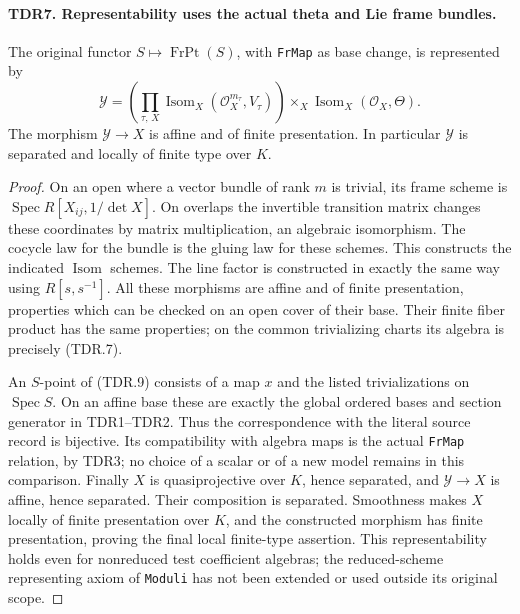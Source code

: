 \paragraph{TDR7. Representability uses the actual theta and Lie frame bundles.}
\label{claim:TDR7}
The original functor \(S\mapsto\operatorname{FrPt}(S)\), with
\texttt{FrMap} as base change, is represented by
\[
 \mathcal Y=
 \left(\prod_{\tau,\,X}
   \operatorname{Isom}_X(\mathcal O_X^{m_\tau},V_\tau)\right)
       \times_X\operatorname{Isom}_X(\mathcal O_X,\Theta).
                                                               \tag{TDR.9}
\]
The morphism \(\mathcal Y\to X\) is affine and of finite
presentation.  In particular \(\mathcal Y\) is separated and
locally of finite type over \(K\).

\begin{proof}
On an open where a vector bundle of rank \(m\) is trivial,
its frame scheme is \(\operatorname{Spec}R[X_{ij},1/\det X]\).
On overlaps the invertible transition matrix changes these
coordinates by matrix multiplication, an algebraic isomorphism.
The cocycle law for the bundle is the gluing law for these schemes.
This constructs the indicated \(\operatorname{Isom}\) schemes.
The line factor is constructed in exactly the same way using
\(R[s,s^{-1}]\).  All these morphisms are affine and of finite
presentation, properties which can be checked on an open cover
of their base.  Their finite fiber product has the same properties;
on the common trivializing charts its algebra is precisely (TDR.7).

An \(S\)-point of (TDR.9) consists of a map \(x\) and the
listed trivializations on \(\operatorname{Spec}S\).  On an
affine base these are exactly the global ordered bases and
section generator in TDR1--TDR2.  Thus the correspondence with
the literal source record is bijective.  Its compatibility with
algebra maps is the actual \texttt{FrMap} relation, by TDR3;
no choice of a scalar or of a new model remains in this comparison.
Finally \(X\) is quasiprojective over \(K\), hence separated,
and \(\mathcal Y\to X\) is affine, hence separated.  Their
composition is separated.  Smoothness makes \(X\) locally of
finite presentation over \(K\), and the constructed morphism
has finite presentation, proving the final local finite-type
assertion.  This representability holds even for nonreduced
test coefficient algebras; the reduced-scheme representing
axiom of \texttt{Moduli} has not been extended or used outside
its original scope.
\end{proof}

